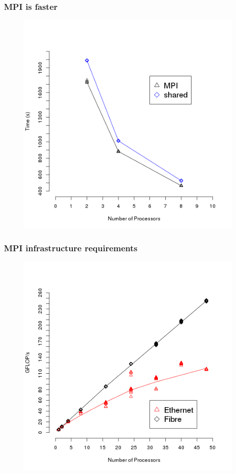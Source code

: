 \begin{frame}
		\frametitle{MPI is faster}
		\begin{figure}
				\includegraphics[width=0.65\linewidth]{figures/diagrams/comparison/comparison}
		\end{figure}
\end{frame}

\begin{frame}
		\frametitle{MPI infrastructure requirements}
		\begin{figure}
				\includegraphics[width=0.65\linewidth]{figures/diagrams/connection/connection}
		\end{figure}
\end{frame}


